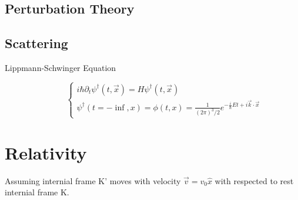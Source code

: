 \subsection{Perturbation Theory}

\subsection{Scattering}
\begin{description}
    \item [Lippmann-Schwinger Equation]
	\begin{equation}
	    \label{eqn:qm:LSEqn}
	    \left\{
		\begin{aligned}
		    i\hbar\partial_t\psi^\dag(t,\vec{x}) = H\psi^\dag(t, \vec{x})   \\
		    \psi^\dag(t=-\inf, x) = \phi(t,x) = \frac{1}{(2\pi)^3/2}e^{-\frac{i}{\hbar}Et + i\vec{k}\cdot\vec{x}} 
		\end{aligned}
		\right.
	\end{equation}
\end{description}

\section{Relativity}
Assuming internial frame K' moves with velocity $\vec{v} = v_0\hat{x}$ with respected to
rest internial frame K.
